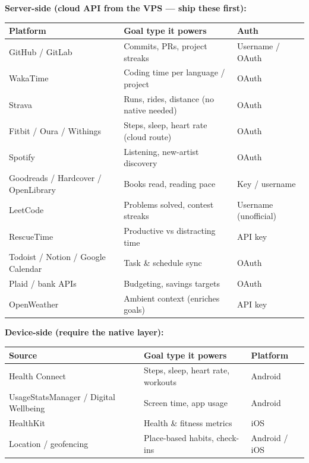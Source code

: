 \documentclass[11pt,a4paper]{article}
\begin{document}
\textbf{Server-side (cloud API from the VPS --- ship these first):}
\begin{center}
\renewcommand{\arraystretch}{1.3}
\begin{tabularx}{\textwidth}{>{\raggedright\arraybackslash}p{3.0cm} >{\raggedright\arraybackslash}X >{\raggedright\arraybackslash}p{3.4cm}}
\toprule
\textbf{Platform} & \textbf{Goal type it powers} & \textbf{Auth} \\
\midrule
GitHub / GitLab & Commits, PRs, project streaks & Username / OAuth \\
WakaTime & Coding time per language / project & OAuth \\
Strava & Runs, rides, distance (no native needed) & OAuth \\
Fitbit / Oura / Withings & Steps, sleep, heart rate (cloud route) & OAuth \\
Spotify & Listening, new-artist discovery & OAuth \\
Goodreads / Hardcover / OpenLibrary & Books read, reading pace & Key / username \\
LeetCode & Problems solved, contest streaks & Username (unofficial) \\
RescueTime & Productive vs distracting time & API key \\
Todoist / Notion / Google Calendar & Task \& schedule sync & OAuth \\
Plaid / bank APIs & Budgeting, savings targets & OAuth \\
OpenWeather & Ambient context (enriches goals) & API key \\
\bottomrule
\end{tabularx}
\end{center}

\textbf{Device-side (require the native layer):}
\begin{center}
\renewcommand{\arraystretch}{1.3}
\begin{tabularx}{\textwidth}{>{\raggedright\arraybackslash}p{3.6cm} >{\raggedright\arraybackslash}X >{\raggedright\arraybackslash}p{3.0cm}}
\toprule
\textbf{Source} & \textbf{Goal type it powers} & \textbf{Platform} \\
\midrule
Health Connect & Steps, sleep, heart rate, workouts & Android \\
UsageStatsManager / Digital Wellbeing & Screen time, app usage & Android \\
HealthKit & Health \& fitness metrics & iOS \\
Location / geofencing & Place-based habits, check-ins & Android / iOS \\
\bottomrule
\end{tabularx}
\end{center}
\end{document}
